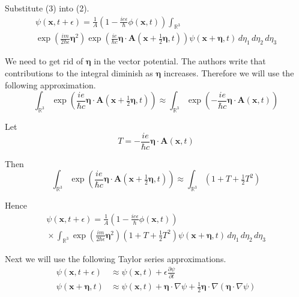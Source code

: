 \documentclass[12pt]{article}
\newcommand\INT{\int_{\mathbb R^3}}
\begin{document}
Substitute (3) into (2).
\begin{multline*}
\psi(\mathbf x,t+\epsilon)=
\frac{1}{A}\left(1-\frac{ie\epsilon}{\hbar}\phi\left(\mathbf x,t\right)\right)\INT
\\
\exp\left(\frac{im}{2\hbar\epsilon}\boldsymbol\eta^2\right)
\exp\left(\frac{ie}{\hbar c}\boldsymbol\eta\cdot\mathbf A\left(\mathbf x+\tfrac{1}{2}\boldsymbol\eta,t\right)\right)
\psi(\mathbf x+\boldsymbol\eta,t)
\,d\eta_1\,d\eta_2\,d\eta_3
\end{multline*}

We need to get rid of $\boldsymbol\eta$ in the vector potential.
The authors write that contributions to the integral
diminish as $\boldsymbol\eta$ increases.
Therefore we will use the following approximation.
\begin{equation*}
\INT\exp\left(\frac{ie}{\hbar c}\boldsymbol\eta\cdot\mathbf A\left(\mathbf x+\tfrac{1}{2}\boldsymbol\eta,t\right)\right)
\approx
\INT\exp\left(-\frac{ie}{\hbar c}\boldsymbol\eta\cdot\mathbf A(\mathbf x,t)\right)
\end{equation*}

Let
\begin{equation*}
T=-\frac{ie}{\hbar c}\boldsymbol\eta\cdot\mathbf A(\mathbf x,t)
\end{equation*}

Then
\begin{equation*}
\INT\exp\left(\frac{ie}{\hbar c}\boldsymbol\eta\cdot\mathbf A\left(\mathbf x+\tfrac{1}{2}\boldsymbol\eta,t\right)\right)
\approx
\INT\left(1+T+\tfrac{1}{2}T^2\right)
\end{equation*}

Hence
\begin{multline*}
\psi(\mathbf x,t+\epsilon)=
\frac{1}{A}
\left(1-\frac{ie\epsilon}{\hbar}\phi\left(\mathbf x,t\right)\right)
\\
{}\times\INT\exp\left(\frac{im}{2\hbar\epsilon}\boldsymbol\eta^2\right)
\left(1+T+\tfrac{1}{2}T^2\right)
\psi(\mathbf x+\boldsymbol\eta,t)
\,d\eta_1\,d\eta_2\,d\eta_3
\tag{4}
\end{multline*}

Next we will use the following Taylor series approximations.
\begin{equation*}
\begin{aligned}
\psi(\mathbf x,t+\epsilon)&\approx\psi(\mathbf x,t)+\epsilon\frac{\partial\psi}{\partial t}
\\
\psi(\mathbf x+\boldsymbol\eta,t)&\approx\psi(\mathbf x,t)+\boldsymbol\eta\cdot\nabla\psi
+\tfrac{1}{2}\boldsymbol\eta\cdot\nabla(\boldsymbol\eta\cdot\nabla\psi)
\end{aligned}
\tag{5}
\end{equation*}
\end{document}
